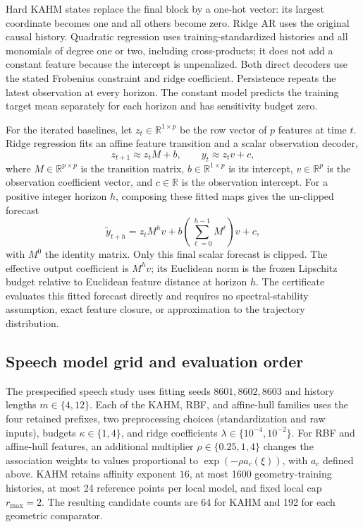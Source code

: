 Hard KAHM states replace the final block by a one-hot vector: its largest
coordinate becomes one and all others become zero. Ridge AR uses the original
causal history. Quadratic regression uses training-standardized histories and
all monomials of degree one or two, including cross-products; it does not add
a constant feature because the intercept is unpenalized. Both direct decoders
use the stated Frobenius constraint and ridge coefficient. Persistence repeats
the latest observation at every horizon. The constant model predicts the
training target mean separately for each horizon and has sensitivity budget
zero.

For the iterated baselines, let $z_t\in\mathbb R^{1\times p}$ be the row vector
of $p$ features at time $t$. Ridge regression fits an affine feature
transition and a scalar observation decoder,
\[
 z_{t+1}\approx z_tM+b,\qquad y_t\approx z_tv+c,
\]
where $M\in\mathbb R^{p\times p}$ is the transition matrix,
$b\in\mathbb R^{1\times p}$ is its intercept, $v\in\mathbb R^p$ is the
observation coefficient vector, and $c\in\mathbb R$ is the observation
intercept. For a positive integer horizon $h$, composing these fitted maps
gives the un-clipped forecast
\[
 \widetilde y_{t+h}
 =z_tM^hv+b\left(\sum_{\ell=0}^{h-1}M^\ell\right)v+c,
\]
with $M^0$ the identity matrix. Only this final scalar forecast is clipped.
The effective output coefficient is $M^hv$; its Euclidean norm is the frozen
Lipschitz budget relative to Euclidean feature distance at horizon $h$.
The certificate evaluates this fitted forecast directly and requires no
spectral-stability assumption, exact feature closure, or approximation to the
trajectory distribution.

\subsection{Speech model grid and evaluation order}
\label{app:speech-protocol}

The prespecified speech study uses fitting seeds $8601,8602,8603$ and history
lengths $m\in\{4,12\}$. Each of the KAHM, RBF, and affine-hull families uses
the four retained prefixes, two preprocessing choices (standardization and
raw inputs), budgets $\kappa\in\{1,4\}$, and ridge coefficients
$\lambda\in\{10^{-4},10^{-2}\}$. For RBF and affine-hull features, an
additional multiplier $\rho\in\{0.25,1,4\}$ changes the association weights
to values proportional to $\exp(-\rho a_c(\xi))$, with $a_c$ defined above.
KAHM retains affinity exponent $16$, at most 1600 geometry-training histories,
at most 24 reference points per local model, and fixed local cap
$r_{\max}=2$. The resulting candidate
counts are 64 for KAHM and 192 for each geometric comparator.

